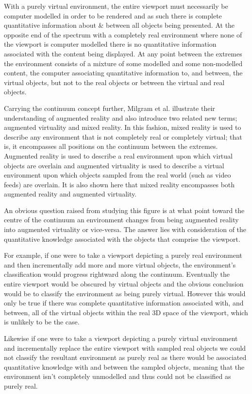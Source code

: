 With a purely virtual environment, the entire viewport must necessarily be computer modelled in order to be rendered and as such there is complete quantitative information about \& between all objects being presented. At the opposite end of the spectrum with a completely real environment where none of the viewport is computer modelled there is no quantitative information associated with the content being displayed. At any point between the extremes the environment consists of a mixture of some modelled and some non-modelled content, the computer associating quantitative information to, and between, the virtual objects, but not to the real objects or between the virtual and real objects.

Carrying the continuum concept further, Milgram et al. illustrate their understanding of augmented reality and also introduce two related new terms; augmented virtuality and mixed reality. In this fashion, mixed reality is used to describe any environment that is not completely real or completely virtual; that is, it encompasses all positions on the continuum between the extremes. Augmented reality is used to describe a real environment upon which virtual objects are overlain and augmented virtuality is used to describe a virtual environment upon which objects sampled from the real world (such as video feeds) are overlain. It is also shown here that mixed reality encompasses both augmented reality and augmented virtuality.

An obvious question raised from studying this figure is at what point toward the centre of the continuum an environment changes from being augmented reality into augmented virtuality or vice-versa. The answer lies with consideration of the quantitative knowledge associated with the objects that comprise the viewport.

For example, if one were to take a viewport depicting a purely real environment and then incrementally add more and more virtual objects, the environment's classification would progress rightward along the continuum. Eventually the entire viewport would be obscured by virtual objects and the obvious conclusion would be to classify the environment as being purely virtual. However this would only be true if there was complete quantitative information associated with, and between, all of the virtual objects within the real 3D space of the viewport, which is unlikely to be the case.

Likewise if one were to take a viewport depicting a purely virtual environment and incrementally replace the entire viewport with sampled real objects we could not classify the resultant environment as purely real as there would be associated quantitative knowledge with and between the sampled objects, meaning that the environment isn't completely unmodelled and thus could not be classified as purely real.

